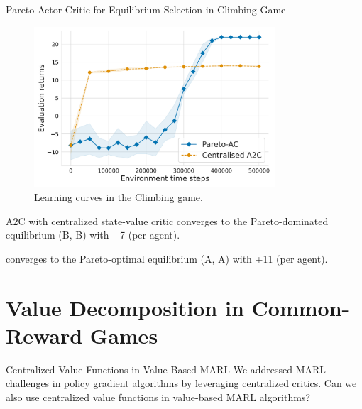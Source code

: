\begin{frame}[t]{Pareto Actor-Critic for Equilibrium Selection in Climbing Game}
    \vspace{1em}

    \begin{minipage}{.6\textwidth}
        \begin{figure}
            \centering
            \includegraphics[width=0.8\textwidth]{images/chapter_9/pac-climbing.pdf}
            \caption{Learning curves in the Climbing game.}
        \end{figure}
    \end{minipage}
    \begin{minipage}{.39\textwidth}
        \blist
            \item<2-> A2C with centralized state-value critic converges to the Pareto-dominated equilibrium (B, B) with +7 (per agent).
            \item<3->  converges to the Pareto-optimal equilibrium (A, A) with +11 (per agent).
        \elist
    \end{minipage}
\end{frame}

\section{Value Decomposition in Common-Reward Games}

\begin{frame}[t]{Centralized Value Functions in Value-Based MARL}
    We addressed MARL challenges in policy gradient algorithms by leveraging centralized critics. Can we also use centralized value functions in value-based MARL algorithms?


\end{frame}

